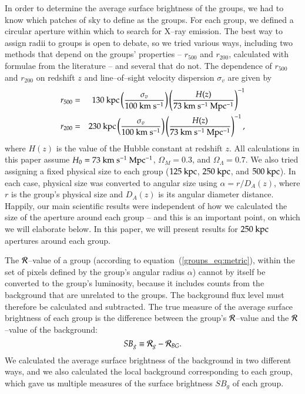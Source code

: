 In order to determine the average surface brightness of the groups, we
had to know which patches of sky to define as the groups.  For each
group, we defined a circular aperture within which to search for
X--ray emission.  The best way to assign radii to groups is open to
debate, so we tried various ways, including two methods that depend on
the groups' properties -- $r_{500}$ and $r_{200}$, calculated with
formulae from the literature -- and several that do not.  The
dependence of $r_{500}$ \citep{osmond+ponman2004} and $r_{200}$
\citep{mahdavi+geller2004} on redshift $z$ and line--of--sight
velocity dispersion $\sigma_v$ are given by
\begin{eqnarray}
\label{groups_eq:r500}
r_{500} & = & 130 {\rm~kpc} \left( \frac{\sigma_v}{100 {\rm~km~s^{-1}}} \right) \left( \frac{H(z)}{73 {\rm~km~s^{-1}~Mpc^{-1}}} \right)^{-1} \\
\label{groups_eq:r200}
r_{200} & = & 230 {\rm~kpc} \left( \frac{\sigma_v}{100 {\rm~km~s^{-1}}} \right) \left( \frac{H(z)}{73 {\rm~km~s^{-1}~Mpc^{-1}}} \right)^{-1},
\end{eqnarray}
where $H(z)$ is the value of the Hubble constant at redshift $z$.  All
calculations in this paper assume $H_0 = 73 {\rm~km~s^{-1}~Mpc^{-1}}$,
$\Omega_M = 0.3$, and $\Omega_\Lambda = 0.7$.  We also tried assigning
a fixed physical size to each group ($125 {\rm~kpc}$, $250 {\rm~kpc}$,
and $500 {\rm~kpc}$).  In each case, physical size was converted to
angular size using $\alpha = r/D_A(z)$, where $r$ is the group's
physical size and $D_A(z)$ is its angular diameter distance.  Happily,
our main scientific results were independent of how we calculated the
size of the aperture around each group -- and this is an important
point, on which we will elaborate below.  In this paper, we will
present results for $250 {\rm~kpc}$ apertures around each group.

The $\mathcal{R}$--value of a group (according to
equation~(\ref{groups_eq:metric}), within the set of pixels defined by
the group's angular radius $\alpha$) cannot by itself be converted to
the group's luminosity, because it includes counts from the background
that are unrelated to the groups.  The background flux level must
therefore be calculated and subtracted.  The true measure of the
average surface brightness of each group is the difference between the
group's $\mathcal{R}$--value and the $\mathcal{R}$--value of the background:
\begin{equation}
\label{groups_eq:brightness}
SB_g \equiv \mathcal{R}_g - \mathcal{R}_{BG}.
\end{equation}
We calculated the average surface brightness of the background in two
different ways, and we also calculated the local background
corresponding to each group, which gave us multiple measures of the
surface brightness $SB_g$ of each group.

